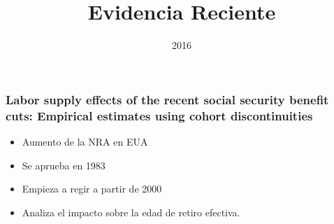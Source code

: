 \documentclass{beamer}
\title{Evidencia Reciente}
\date{2016}
\begin{document}
\maketitle

\frame
{

  \frametitle{Labor supply effects of the recent social security benefit cuts: Empirical estimates using cohort discontinuities}
  
  \begin{itemize}
  \item Aumento de la NRA en EUA
  \item Se aprueba en 1983
  \item Empieza a regir a partir de 2000
  \item Analiza el impacto sobre la edad de retiro efectiva.
  \end{itemize}
}
\end{document}
